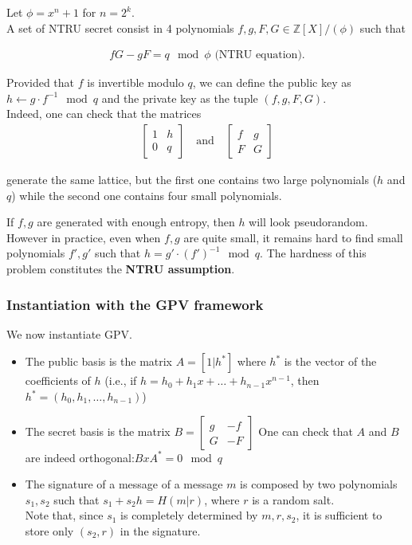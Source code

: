 \noindent
Let $\phi = x^n +1$ for $n = 2^k$.\\
A set of NTRU secret consist in 4 polynomials $f, g, F, G \in \mathbb{Z}[X]/(\phi)$ such that 

\begin{align*}
    fG - gF = q \mod \phi  \text{ (NTRU equation)}.
\end{align*}

\noindent
Provided that $f$ is invertible modulo $q$, we can define the public key as $h \gets g  \cdot f^{-1} \mod q$ and the private key as the tuple $(f, g, F, G)$.\\
Indeed, one can check that the matrices 
\begin{align*}
    \left[ \begin{array}{c|c}
        1 & h \\
        \hline
        0 & q
    \end{array} \right] \quad \text{and} \quad \left[ \begin{array}{c|c}
        f & g \\
        \hline
        F & G
    \end{array} \right]
\end{align*}

\noindent
generate the same lattice, but the first one contains two large polynomials ($h$ and $q$) while the second one contains four small polynomials.
\medskip

\noindent
If $f, g$ are generated with enough entropy, then $h$ will look pseudorandom. However in practice, even when $f, g$ are quite small, it remains hard to find small polynomials $f', g'$ such that $h = g' \cdot (f')^{-1} \mod q$. The hardness of this problem constitutes the \textbf{NTRU assumption}.

\subsubsection*{Instantiation with the GPV framework}
We now instantiate GPV.

\begin{itemize}
    \item The public basis is the matrix $A = [1 | h^*]$ where $h^*$ is the vector of the coefficients of $h$ (i.e., if $h = h_0 + h_1 x + \ldots + h_{n-1} x^{n-1}$, then $h^* = (h_0, h_1, \ldots, h_{n-1})$)
    
    \item The secret basis is the matrix $B = \left[ \begin{array}{c|c}
        g & -f \\
        \hline
        G & -F
    \end{array} \right]$
    One can check that $A$ and $B$ are indeed orthogonal:$B x A^* = 0 \mod q$ 

    \item The signature of a message of a message $m$ is composed by two polynomials $s_1, s_2$ such that $s_1 + s_2 h = H(m|r)$, where $r$ is a random salt.\\
    Note that, since $s_1$ is completely determined by $m, r, s_2$, it is sufficient to store only $(s_2, r)$ in the signature.
\end{itemize}

